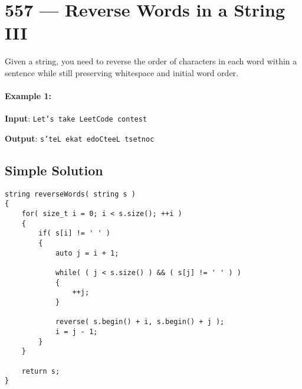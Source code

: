 \section{557 --- Reverse Words in a String III}
Given a string, you need to reverse the order of characters in each word within a sentence while still preserving whitespace and initial word order.

\paragraph{Example 1:}

\begin{flushleft}

\textbf{Input}: \texttt{Let's take LeetCode contest}

\textbf{Output}: \texttt{s'teL ekat edoCteeL tsetnoc}

\end{flushleft}


\subsection{Simple Solution}

\setcounter{lstlisting}{0}
\begin{lstlisting}[style=customc, caption={Simple Solution}]
string reverseWords( string s )
{
    for( size_t i = 0; i < s.size(); ++i )
    {
        if( s[i] != ' ' )
        {
            auto j = i + 1;

            while( ( j < s.size() ) && ( s[j] != ' ' ) )
            {
                ++j;
            }

            reverse( s.begin() + i, s.begin() + j );
            i = j - 1;
        }
    }

    return s;
}
\end{lstlisting}